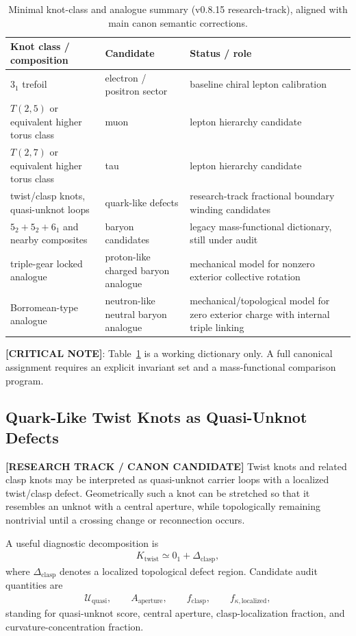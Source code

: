 \begin{table}[h]
\centering
\begin{tabular}{lll}
\hline
Knot class / composition & Candidate & Status / role \\
\hline
$3_1$ trefoil & electron / positron sector & baseline chiral lepton calibration \\
$T(2,5)$ or equivalent higher torus class & muon & lepton hierarchy candidate \\
$T(2,7)$ or equivalent higher torus class & tau & lepton hierarchy candidate \\
twist/clasp knots, quasi-unknot loops & quark-like defects & research-track fractional boundary winding candidates \\
$5_2+5_2+6_1$ and nearby composites & baryon candidates & legacy mass-functional dictionary, still under audit \\
triple-gear locked analogue & proton-like charged baryon analogue & mechanical model for nonzero exterior collective rotation \\
Borromean-type analogue & neutron-like neutral baryon analogue & mechanical/topological model for zero exterior charge with internal triple linking \\
\hline
\end{tabular}
\caption{Minimal knot-class and analogue summary (v0.8.15 research-track), aligned with main canon semantic corrections.}
\label{tab:particle-candidates}
\end{table}

\textbf{[CRITICAL NOTE]}: Table~\ref{tab:particle-candidates} is a working dictionary only. A full canonical assignment requires an explicit invariant set and a mass-functional comparison program.


\subsection{Quark-Like Twist Knots as Quasi-Unknot Defects}
\label{subsec:rt_quark_twist_quasi_unknot}

\textbf{[RESEARCH TRACK / CANON CANDIDATE]} Twist knots and related clasp knots may be interpreted as quasi-unknot carrier loops with a localized twist/clasp defect. Geometrically such a knot can be stretched so that it resembles an unknot with a central aperture, while topologically remaining nontrivial until a crossing change or reconnection occurs.

A useful diagnostic decomposition is
\begin{align}
    K_{\mathrm{twist}}
    \simeq
    0_1 + \Delta_{\mathrm{clasp}},
\end{align}
where $\Delta_{\mathrm{clasp}}$ denotes a localized topological defect region. Candidate audit quantities are
\begin{align}
    \mathcal{U}_{\mathrm{quasi}},\qquad
    A_{\mathrm{aperture}},\qquad
    f_{\mathrm{clasp}},\qquad
    f_{\kappa,\mathrm{localized}},
\end{align}
standing for quasi-unknot score, central aperture, clasp-localization fraction, and curvature-concentration fraction.

